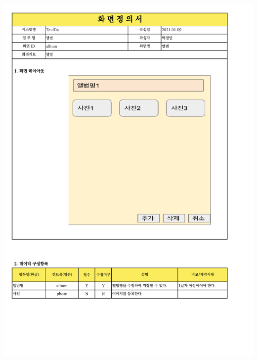 {{{{{{{{{{{{{{{{{{{{{{{{{{{{{{{{{{{{{{\includegraphics[width=20cm]{./Figure/Analysis/Display/photo/photo_05.pdf} \\
}}}}}}}}}}}}}}}}}}}}}}}}}}}}}}}}}}}}}}
